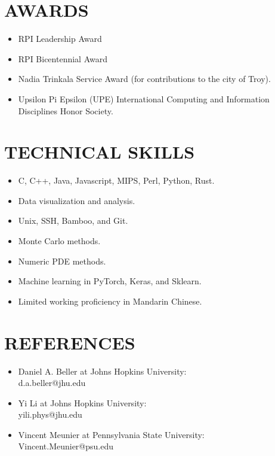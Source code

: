 \documentclass[margin, 10pt]{res} %
\begin{document}
\begin{resume}
\section{AWARDS}
\begin{itemize}
\item RPI Leadership Award
\item RPI Bicentennial Award
    \item Nadia Trinkala Service Award (for contributions to the city of Troy).
    \item Upsilon Pi Epsilon (UPE) International Computing and Information Disciplines Honor Society.
    \end{itemize}


\section{TECHNICAL SKILLS} 
\begin{itemize}
    \item C, C++, Java, Javascript, MIPS, Perl, Python, Rust.
    \item Data visualization and analysis.
    \item Unix, SSH, Bamboo, and Git.
    \item Monte Carlo methods.
    \item Numeric PDE methods.
    \item Machine learning in PyTorch, Keras, and Sklearn. 
    \item Limited working proficiency in Mandarin Chinese.
\end{itemize} 
\section{REFERENCES}
\begin{itemize}
    \item Daniel A. Beller at Johns Hopkins University:\\
    d.a.beller@jhu.edu
    \item Yi Li at Johns Hopkins University:\\
    yili.phys@jhu.edu
    \item Vincent Meunier at Pennsylvania State University:\\
    Vincent.Meunier@psu.edu
\end{itemize}

\end{resume}
\end{document}
